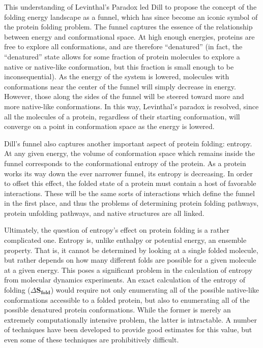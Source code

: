 This understanding of Levinthal's Paradox led Dill to propose the concept of the folding energy landscape as a funnel\cite{Dill:2008p283}, which has since become an iconic symbol of the protein folding problem. The funnel captures the essence of the relationship between energy and conformational space. At high enough energies, proteins are free to explore all conformations, and are therefore ``denatured'' (in fact, the ``denatured'' state allows for some fraction of protein molecules to explore a native or native-like conformation, but this fraction is small enough to be inconsequential). As the energy of the system is lowered, molecules with conformations near the center of the funnel will simply decrease in energy. However, those along the sides of the funnel will be steered toward more and more native-like conformations. In this way, Levinthal's paradox is resolved, since all the molecules of a protein, regardless of their starting conformation, will converge on a point in conformation space as the energy is lowered.

Dill's funnel also captures another important aspect of protein folding: entropy. At any given energy, the volume of conformation space which remains inside the funnel corresponds to the conformational entropy of the protein. As a protein works its way down the ever narrower funnel, its entropy is decreasing. In order to offset this effect, the folded state of a protein must contain a host of favorable interactions. These will be the same sorts of interactions which define the funnel in the first place, and thus the problems of determining protein folding pathways, protein unfolding pathways, and native structures are all linked. 

Ultimately, the question of entropy's effect on protein folding is a rather complicated one. Entropy is, unlike enthalpy or potential energy, an ensemble property. That is, it cannot be determined by looking at a single folded molecule, but rather depends on how many different folds are possible for a given molecule at a given energy\cite{Meirovitch:2007p317}. This poses a significant problem in the calculation of entropy from molecular dynamics experiments. An exact calculation of the entropy of folding ($\Delta \mathrm{\mathbf{S_{fold}}}$) would require not only enumerating all of the possible native-like conformations accessible to a folded protein, but also to enumerating all of the possible denatured protein conformations. While the former is merely an extremely computationally intensive problem, the latter is intractable. A number of techniques have been developed to provide good estimates for this value, but even some of these techniques are prohibitively difficult.

